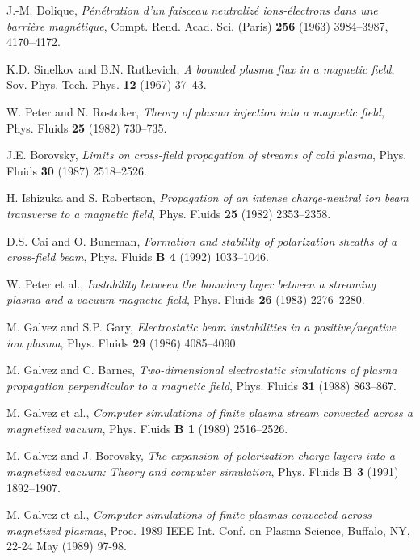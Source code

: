 \documentclass [12pt,a4paper,     ]{report} %
\begin{document}
\begin{enumerate}

 J.-M. Dolique, \emph{P\'en\'etration d'un faisceau neutraliz\'e ions-\'electrons dans une barri\`ere magn\'etique}, Compt. Rend. Acad. Sci. (Paris) {\bf 256} (1963) 3984--3987, 4170--4172.

 K.D. Sinelkov and B.N. Rutkevich, \emph{A bounded plasma flux in a magnetic field}, Sov. Phys. Tech. Phys. {\bf 12} (1967) 37--43.

 W. Peter and N. Rostoker, \emph{Theory of plasma injection into a magnetic field}, Phys. Fluids {\bf 25} (1982) 730--735.

 J.E. Borovsky, \emph{Limits on cross-field propagation of streams of cold plasma}, Phys. Fluids {\bf 30} (1987) 2518--2526.

 H. Ishizuka and S. Robertson, \emph{Propagation of an intense charge-neutral ion beam transverse to a magnetic field}, Phys. Fluids {\bf 25} (1982) 2353--2358.

 D.S. Cai and O. Buneman, \emph{Formation and stability of polarization sheaths of a cross-field beam}, Phys. Fluids {\bf B 4} (1992) 1033--1046.

 W. Peter et al., \emph{Instability between the boundary layer between a streaming plasma and a vacuum magnetic field}, Phys. Fluids {\bf 26} (1983) 2276--2280.

 M. Galvez and S.P. Gary, \emph{Electrostatic beam instabilities in a positive/negative ion plasma}, Phys. Fluids {\bf 29} (1986) 4085--4090. %

 M. Galvez and C. Barnes,  \emph{Two-dimensional electrostatic simulations of plasma propagation perpendicular to a magnetic field}, Phys. Fluids {\bf 31} (1988) 863--867.

 M. Galvez et al.,  \emph{Computer simulations of finite plasma stream convected across a magnetized vacuum}, Phys. Fluids {\bf B 1} (1989) 2516--2526.

 M. Galvez and J. Borovsky,  \emph{The expansion of polarization charge layers into a magnetized vacuum: Theory and computer simulation}, Phys. Fluids {\bf B 3} (1991) 1892--1907.


 M. Galvez et al.,  \emph{Computer simulations of finite plasmas convected across magnetized plasmas}, Proc. 1989 IEEE Int. Conf. on  Plasma Science, Buffalo, NY, 22-24 May (1989) 97-98.



\end{enumerate}
\end{document}
